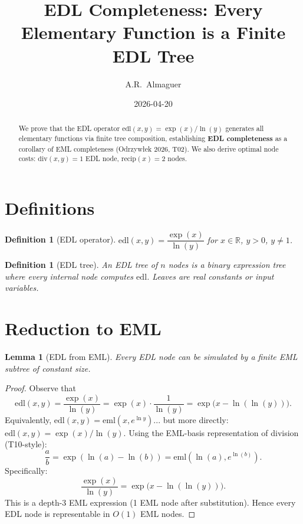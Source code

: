 \documentclass[11pt]{article}
\title{EDL Completeness: Every Elementary Function is a Finite EDL Tree}
\author{A.R.\ Almaguer}
\date{2026-04-20}
\newtheorem{lemma}[theorem]{Lemma}
\newtheorem{definition}[theorem]{Definition}
\begin{document}
\maketitle

\begin{abstract}
We prove that the EDL operator $\mathrm{edl}(x,y) = \exp(x)/\ln(y)$ generates all elementary
functions via finite tree composition, establishing \textbf{EDL completeness} as a corollary
of EML completeness (Odrzyw\l{}ek 2026, T02). We also derive optimal node costs:
$\mathrm{div}(x,y) = 1$ EDL node, $\mathrm{recip}(x) = 2$ nodes.
\end{abstract}

\section{Definitions}

\begin{definition}[EDL operator]
$\mathrm{edl}(x,y) = \dfrac{\exp(x)}{\ln(y)}$ for $x \in \mathbb{R}$, $y > 0$, $y \neq 1$.
\end{definition}

\begin{definition}[EDL tree]
An \emph{EDL tree} of $n$ nodes is a binary expression tree where every internal node
computes $\mathrm{edl}$. Leaves are real constants or input variables.
\end{definition}

\section{Reduction to EML}

\begin{lemma}[EDL from EML]\label{lem:edl-from-eml}
Every EDL node can be simulated by a finite EML subtree of constant size.
\end{lemma}

\begin{proof}
Observe that
\[
  \mathrm{edl}(x,y) = \frac{\exp(x)}{\ln(y)}
  = \exp(x) \cdot \frac{1}{\ln(y)}
  = \exp\!\bigl(x - \ln(\ln(y))\bigr).
\]
Equivalently, $\mathrm{edl}(x,y) = \mathrm{eml}(x, e^{\ln y})$... but more directly:
$\mathrm{edl}(x,y) = \exp(x) / \ln(y)$.
Using the EML-basis representation of division (T10-style):
\[
  \frac{a}{b} = \exp(\ln(a) - \ln(b)) = \mathrm{eml}(\ln(a), e^{\ln(b)}).
\]
Specifically:
\[
  \frac{\exp(x)}{\ln(y)} = \exp\!\bigl(x - \ln(\ln(y))\bigr).
\]
This is a depth-3 EML expression (1 EML node after substitution). Hence every EDL
node is representable in $O(1)$ EML nodes.
\end{proof}
\end{document}
